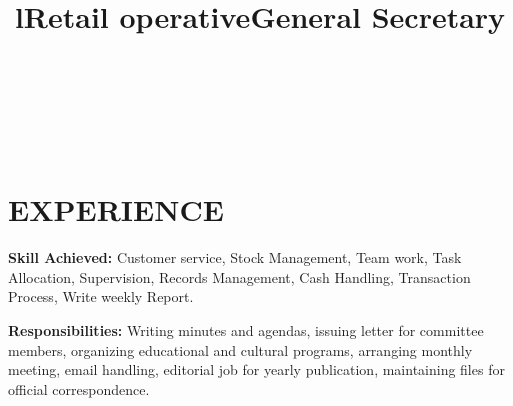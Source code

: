 \documentclass[margin]{res}
\begin{document}
\begin{resume}


\begin{format}
\title{l}\\
\\
\body\\
\end{format}

\section{EXPERIENCE}

\title{\textbf{Retail operative}}
\begin{position}
\textbf{Skill Achieved:}
Customer service, Stock Management, Team work, Task Allocation, Supervision, Records Management, Cash Handling, Transaction Process, Write weekly Report.
\end{position}

\title{\textbf{General Secretary}}
\begin{position}
\textbf{Responsibilities:}
Writing minutes and agendas, issuing letter for committee members, organizing educational and cultural programs, arranging monthly meeting, email handling, editorial job for yearly publication, maintaining files for official correspondence.
\end{position}


  

\end{resume}
\end{document}
